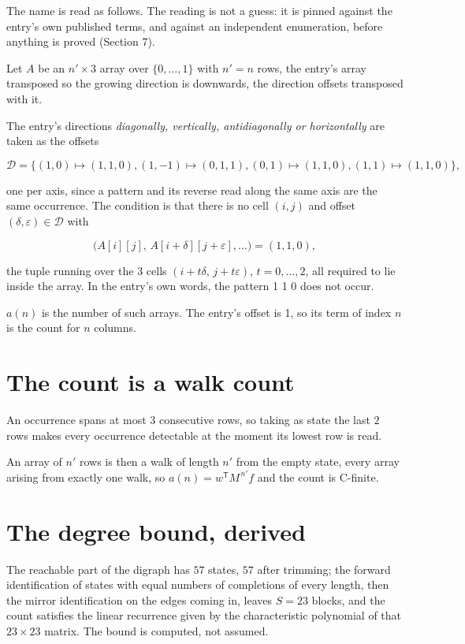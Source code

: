 \documentclass[11pt]{article}
\theoremstyle{definition}
\begin{document}
The name is read as follows. The reading is not a guess: it is pinned against the entry's own published terms, and against an independent enumeration, before anything is proved (Section 7).

Let $A$ be an $n' \times 3$ array over $\{0,\dots,1\}$ with $n' = n$ rows, the entry's array transposed so the growing direction is downwards, the direction offsets transposed with it.

The entry's directions {\itshape diagonally, vertically, antidiagonally or horizontally} are taken as the offsets

\[\mathcal{D} = \{(1,0)\mapsto(1,1,0), (1,-1)\mapsto(0,1,1), (0,1)\mapsto(1,1,0), (1,1)\mapsto(1,1,0)\},\]

one per axis, since a pattern and its reverse read along the same axis are the same occurrence. The condition is that there is no cell $(i,j)$ and offset $(\delta,\varepsilon)\in\mathcal{D}$ with

\[\bigl(A[i][j],\,A[i{+}\delta][j{+}\varepsilon],\dots\bigr) = (1, 1, 0),\]

the tuple running over the $3$ cells $(i+t\delta,\,j+t\varepsilon)$, $t = 0,\dots,2$, all required to lie inside the array. In the entry's own words, the pattern 1 1 0 does not occur.

$a(n)$ is the number of such arrays. The entry's offset is 1, so its term of index $n$ is the count for $n$ columns.

\section{The count is a walk count}

An occurrence spans at most $3$ consecutive rows, so taking as state the last $2$ rows makes every occurrence detectable at the moment its lowest row is read.

An array of $n'$ rows is then a walk of length $n'$ from the empty state, every array arising from exactly one walk, so $a(n) = w^{\mathsf T}M^{\,n'}f$ and the count is C-finite.

\section{The degree bound, derived}

The reachable part of the digraph has $57$ states, $57$ after trimming; the forward identification of states with equal numbers of completions of every length, then the mirror identification on the edges coming in, leaves $S = 23$ blocks, and the count satisfies the linear recurrence given by the characteristic polynomial of that $23\times23$ matrix. The bound is computed, not assumed.
\end{document}
